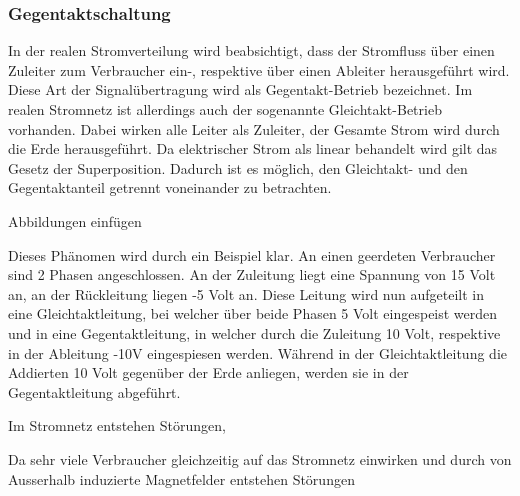 \subsubsection{Gegentaktschaltung} \label{subsec:gegentakt}

In der realen Stromverteilung wird beabsichtigt, dass der Stromfluss über einen Zuleiter zum Verbraucher ein-, respektive über einen Ableiter herausgeführt wird. 
Diese Art der Signalübertragung wird als Gegentakt-Betrieb bezeichnet. Im realen Stromnetz ist allerdings auch der sogenannte Gleichtakt-Betrieb vorhanden. Dabei wirken alle Leiter als Zuleiter, der Gesamte Strom wird durch die Erde herausgeführt. Da elektrischer Strom als linear behandelt wird gilt das Gesetz der Superposition. Dadurch ist es möglich, den Gleichtakt- und den Gegentaktanteil getrennt voneinander zu betrachten.
 
 Abbildungen einfügen
 
 Dieses Phänomen wird durch ein Beispiel klar. An einen geerdeten Verbraucher sind 2 Phasen angeschlossen. An der Zuleitung liegt eine Spannung von 15 Volt an, an der Rückleitung liegen -5 Volt an. Diese Leitung wird nun aufgeteilt in eine Gleichtaktleitung, bei welcher über beide Phasen 5 Volt eingespeist werden und in eine Gegentaktleitung, in welcher durch die Zuleitung 10 Volt, respektive in der Ableitung -10V eingespiesen werden. Während in der Gleichtaktleitung die Addierten 10 Volt gegenüber der Erde anliegen, werden sie in der Gegentaktleitung abgeführt.
 
 



 Im Stromnetz entstehen Störungen, 

Da sehr viele Verbraucher gleichzeitig auf das Stromnetz einwirken und durch von Ausserhalb induzierte Magnetfelder entstehen Störungen